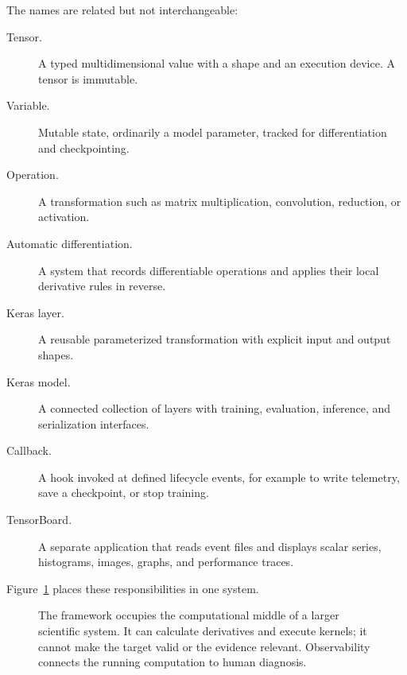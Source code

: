 The names are related but not interchangeable:

\begin{description}
  \item[Tensor.] A typed multidimensional value with a shape and an execution
  device. A tensor is immutable.
  \item[Variable.] Mutable state, ordinarily a model parameter, tracked for
  differentiation and checkpointing.
  \item[Operation.] A transformation such as matrix multiplication,
  convolution, reduction, or activation.
  \item[Automatic differentiation.] A system that records differentiable
  operations and applies their local derivative rules in reverse.
  \item[Keras layer.] A reusable parameterized transformation with explicit
  input and output shapes.
  \item[Keras model.] A connected collection of layers with training,
  evaluation, inference, and serialization interfaces.
  \item[Callback.] A hook invoked at defined lifecycle events, for example to
  write telemetry, save a checkpoint, or stop training.
  \item[TensorBoard.] A separate application that reads event files and
  displays scalar series, histograms, images, graphs, and performance traces.
\end{description}

Figure~\ref{fig:tensorflow-stack} places these responsibilities in one system.

\begin{figure}[htbp]
\centering
{}
\caption{The framework occupies the computational middle of a larger
scientific system. It can calculate derivatives and execute kernels; it cannot
make the target valid or the evidence relevant. Observability connects the
running computation to human diagnosis.}
\label{fig:tensorflow-stack}
\end{figure}

